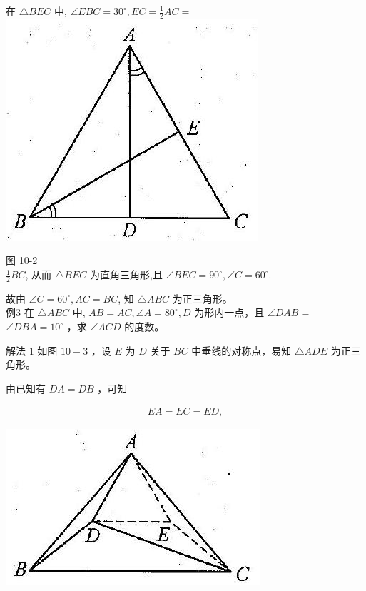 \documentclass[10pt]{article}
\begin{document}
在 $\triangle B E C$ 中, $\angle E B C=30^{\circ}, E C=\frac{1}{2} A C=$\\
\includegraphics[max width=\textwidth, center]{2024_10_30_2c8f45efd4a519b08e1ag-096(1)}

图 10-2\\
$\frac{1}{2} B C$, 从而 $\triangle B E C$ 为直角三角形,且 $\angle B E C=90^{\circ}, \angle C=60^{\circ}$.

故由 $\angle C=60^{\circ}, A C=B C$, 知 $\triangle A B C$ 为正三角形。\\
例3 在 $\triangle A B C$ 中, $A B=A C, \angle A=80^{\circ}, D$ 为形内一点，且 $\angle D A B=$ $\angle D B A=10^{\circ}$ ，求 $\angle A C D$ 的度数。

解法 1 如图 $10-3$ ，设 $E$ 为 $D$ 关于 $B C$ 中垂线的对称点，易知 $\triangle A D E$ 为正三角形。

由已知有 $D A=D B$ ，可知

\begin{align*}
E A=E C=E D,
\end{align*}

\begin{center}
\includegraphics[max width=\textwidth]{2024_10_30_2c8f45efd4a519b08e1ag-096(2)}
\end{center}
\end{document}
